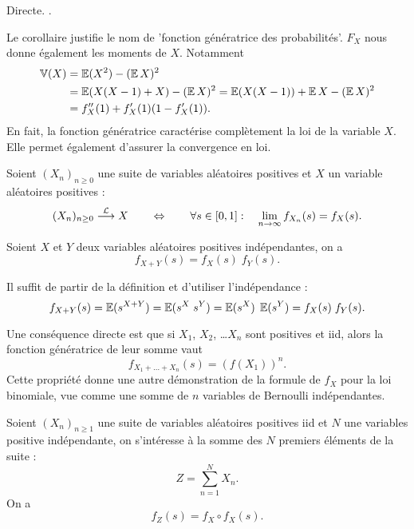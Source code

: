 \proof 
Directe.
\eproof.

\remark
Le corollaire justifie le nom de 'fonction génératrice des probabilités'. $F_X$ nous donne également les moments de $X$. Notamment
\begin{align*}
  \operatorname{\mathbb{V}}(X) 
  & = \operatorname{\mathbb{E}}(X^2) - (\operatorname{\mathbb{E}} X)^2 \\
  & = \operatorname{\mathbb{E}}(X(X-1) + X) - (\operatorname{\mathbb{E}} X)^2
  = \operatorname{\mathbb{E}}(X(X-1)) + \operatorname{\mathbb{E}} X - (\operatorname{\mathbb{E}} X)^2 \\
  & = f''_X(1) + f'_X(1)(1 - f'_X(1)). 
\end{align*}
En fait, la fonction génératrice caractérise complètement la loi de la variable $X$. Elle permet également d'assurer la convergence en loi.

\begin{proposition*}
  Soient $(X_n)_{n \geq 0}$ une suite de variables aléatoires positives et $X$ un variable aléatoires positives :
  $$
  (X_n)_{n \geq 0} \overset{\mathcal{L}}{\longrightarrow} X
  \qquad \Leftrightarrow \qquad
  \forall s \in [0, 1]: \quad \lim_{n \rightarrow \infty} f_{X_n}(s) = f_X(s).
  $$
\end{proposition*}

\begin{proposition*}
  Soient $X$ et $Y$ deux variables aléatoires positives indépendantes, on a
  $$
  f_{X+Y}(s) = f_X(s) \; f_Y(s).
  $$
\end{proposition*}

\proof
Il suffit de partir de la définition et d'utiliser l'indépendance :
$$
f_{X+Y}(s) 
= \operatorname{\mathbb{E}}(s^{X+Y}) = \operatorname{\mathbb{E}}(s^X \; s^Y) = \operatorname{\mathbb{E}}(s^X) \;  \operatorname{\mathbb{E}}(s^Y)
= f_X(s) \; f_Y(s).
$$
\eproof

\remark
Une conséquence directe est que si $X_1$, $X_2$, \dots $X_n$ sont positives et iid, alors la fonction génératrice de leur somme vaut
$$
f_{X_1 + \dots + X_n}(s) = \left(f(X_1)\right)^n.
$$
Cette propriété donne une autre démonstration de la formule de $f_X$ pour la loi binomiale, vue comme une somme de $n$ variables de Bernoulli indépendantes.

\begin{proposition*}
  Soient $(X_n)_{n \geq 1}$ une suite de variables aléatoires positives iid et $N$ une variables positive indépendante, on s'intéresse à la somme des $N$ premiers éléments de la suite :
  $$
  Z = \sum_{n=1}^N X_n.
  $$
  On a 
  $$
  f_{Z}(s) = f_X \circ f_X(s).
  $$
\end{proposition*}


